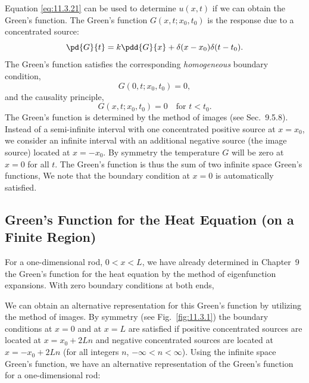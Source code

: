 Equation \eqref{eq:11.3.21} can be used to determine $u(x,t)$ if we can obtain the Green's function.  The Green's function $G(x,t;x_0,t_0)$ is the response due to a concentrated source:
\[
\pd{G}{t} = k\pdd{G}{x} + \delta(x - x_0)\delta(t - t_0).
\]
The Green's function satisfies the corresponding \emph{homogeneous} boundary condition,
\[
G(0,t;x_0,t_0) = 0,
\]
and the causality principle,
\[
G(x,t;x_0,t_0) = 0 \quad \text{for } t < t_0.
\]
The Green's function is determined by the method of images (see Sec.~9.5.8).  Instead of a semi-infinite interval with one concentrated positive source at $x = x_0$, we consider an infinite interval with an additional negative source (the image source) located at $x = -x_0$.  By symmetry the temperature $G$ will be zero at $x = 0$ for all $t$.  The Green's function is thus the sum of two infinite space Green's functions,
We note that the boundary condition at $x = 0$ is automatically satisfied.

\subsection{Green's Function for the Heat Equation (on a Finite Region)}
\label{subsec:finite-greens-heat}

For a one-dimensional rod, $0 < x < L$, we have already determined in Chapter~9 the Green's function for the heat equation by the method of eigenfunction expansions.  With zero boundary conditions at both ends,

We can obtain an alternative representation for this Green's function by utilizing the method of images.  By symmetry (see Fig.~\ref{fig:11.3.1}) the boundary conditions at $x = 0$ and at $x = L$ are satisfied if positive concentrated sources are located at $x = x_0 + 2Ln$ and negative concentrated sources are located at $x = -x_0 + 2Ln$ (for all integers $n$, $-\infty < n < \infty$).  Using the infinite space Green's function, we have an alternative representation of the Green's function for a one-dimensional rod:

